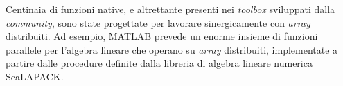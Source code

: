 Centinaia di funzioni native, e altrettante presenti nei \textit{toolbox} sviluppati dalla \textit{community}, sono state progettate per lavorare sinergicamente con \textit{array} distribuiti.\newline
Ad esempio, MATLAB prevede un enorme insieme di funzioni parallele per l'algebra lineare che operano su \textit{array} distribuiti, implementate a partire dalle procedure definite dalla libreria di algebra lineare numerica ScaLAPACK.